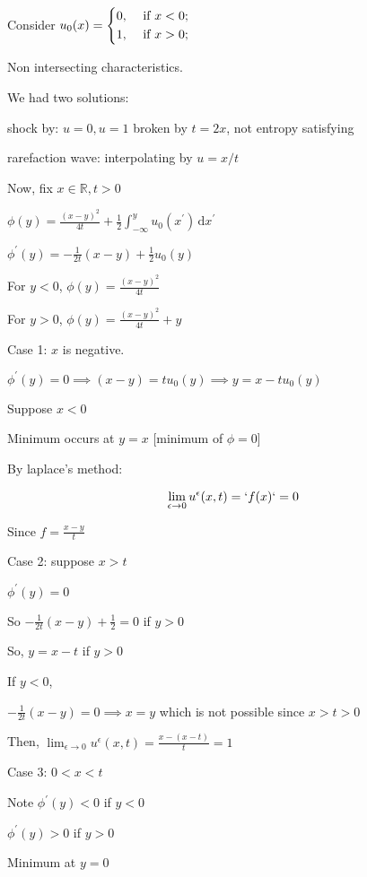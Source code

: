 \documentclass{article}
\theoremstyle{definition}
\begin{document}
Consider \(u_0(x) = \begin{dcases}
    0, &\text{ if } x < 0 ;\\
    1, &\text{ if } x > 0 ;
\end{dcases}\) 

Non intersecting characteristics.

We had two solutions:

shock by: \(u = 0, u=1\) broken by \(t=2x\), not entropy satisfying

rarefaction wave: interpolating by \(u = x / t\) 

Now, fix \(x\in\mathbb{R}, t > 0\)

\(\phi(y) = \frac{(x-y)^2}{4t} + \frac{1}{2} \int_{-\infty}^{y} u_0(x^{\prime}) \,\mathrm{d}x^{\prime} \) 

\(\phi^{\prime}(y) = -\frac{1}{2t}(x-y) + \frac{1}{2}u_0(y)\) 

For \(y < 0\), \(\phi(y) = \frac{(x-y)^2}{4t}\) 

For \(y > 0\), \(\phi(y) = \frac{(x-y)^2}{4t} + y\) 

Case 1: \(x\) is negative.

\(\phi^{\prime} (y) = 0 \implies (x-y) = t u_0(y) \implies y = x - t u_0(y)\)

Suppose \(x < 0\)

Minimum occurs at \(y = x\) [minimum of \(\phi = 0\)]


By laplace's method:

\[
    \lim_{\epsilon \to 0} u^{\epsilon}(x,t) = `f(x)` = 0  
\]

Since \(f = \frac{x-y}{t}\) 

Case 2: suppose \(x > t\) 

\(\phi^{\prime} (y) = 0\)

So \(-\frac{1}{2t}(x-y) + \frac{1}{2} = 0\) if \(y > 0\) 

So, \(y = x - t\) if \(y > 0\) 

If \(y < 0\),

\(-\frac{1}{2t}(x-y) = 0 \implies x = y\) which is not possible since \(x > t > 0\) 


Then, \(\lim_{\epsilon \to 0} u^{\epsilon} (x,t) = \frac{x-(x-t)}{t} = 1  \) 

Case 3: \(0 < x < t\) 

Note \(\phi^{\prime} (y) < 0\) if \(y < 0\) 

\(\phi^{\prime} (y) > 0\) if \(y > 0\) 

Minimum at \(y = 0\) 
\end{document}
